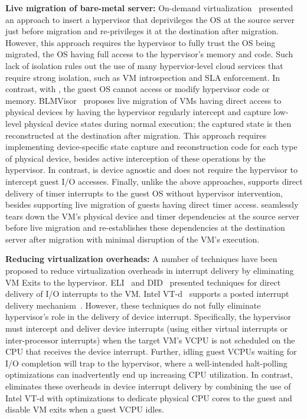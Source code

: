 {\bf Live migration of bare-metal server:} 
On-demand virtualization~\cite{ondemand} presented an approach
to insert a hypervisor that deprivileges the OS at the 
source server just before migration and re-privileges it
at the destination after migration. However, this approach 
requires the hypervisor to fully trust the OS being migrated, 
the OS having full access to the hypervisor's memory and code.
Such lack of isolation rules out the use of many hypervior-level
cloud services that require strong isolation, such as VM introspection
and SLA enforcement. In contrast, with \na, the guest OS 
cannot access or modify hypervisor code or memory.
BLMVisor~\cite{blmvisor,blmvisor-journal} proposes live migration of VMs 
having direct access to physical devices by having the hypervisor
regularly intercept and capture low-level physical device states
during normal execution; the captured state is then reconstructed
at the destination after migration. This approach requires
implementing device-specific state capture and reconstruction code 
for each type of physical device, besides active 
interception of these operations by the hypervisor. 
In contrast, \na is device agnostic and does not require
the hypervisor to intercept guest I/O accesses.
Finally, unlike the above approaches,
\na supports direct delivery of timer interrupts 
to the guest OS without hypervisor intervention, besides supporting
live migration of guests having direct timer access.
\na seamlessly tears down the VM's
physical device and timer dependencies  at the source server before live migration and 
re-establishes these dependencies at the destination server after migration
with minimal disruption of the VM's execution.


{\bf Reducing virtualization overheads:}
A number of techniques have been proposed to reduce virtualization
overheads in interrupt delivery by eliminating VM Exits to the hypervisor.
ELI~\cite{amit:2015} and DID~\cite{tu:2015} presented techniques
for direct delivery of I/O interrupts to the VM. 
Intel VT-d~\cite{intelvtd-paper,intelvtd-manual} supports a posted interrupt delivery mechanism~\cite{postedinterrupt}.
However, these techniques do not fully eliminate hypervisor's role
in the delivery of device interrupt.
Specifically, the hypervisor must intercept and deliver device interrupts
(using either virtual interrupts or inter-processor interrupts)
when the target VM's VCPU is not scheduled on the CPU
that receives the device interrupt. Further, idling guest VCPUs
waiting for I/O completion will trap to the hypervisor, where a well-intended
halt-polling optimizations can inadvertently end up increasing CPU utilization.
In contrast, \na eliminates these 
overheads in device interrupt delivery by 
combining the use of Intel VT-d with optimizations to
dedicate physical CPU cores to the guest and disable VM exits when a guest VCPU idles.

